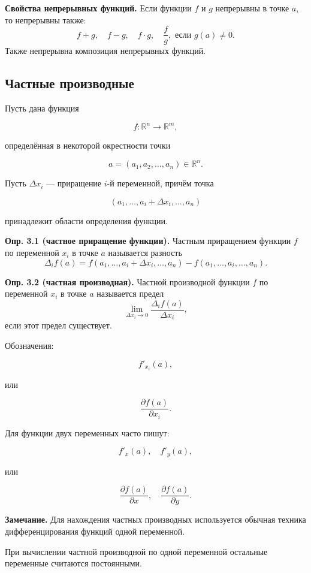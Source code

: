 \documentclass[a4paper,12pt]{article}
\begin{document}
\begin{theorembox}
\textbf{Свойства непрерывных функций.}
Если функции $f$ и $g$ непрерывны в точке $a$, то непрерывны также:
\[
f+g,\quad
f-g,\quad
f\cdot g,\quad
\frac{f}{g}, \text{ если } g(a)\ne 0.
\]
Также непрерывна композиция непрерывных функций.
\end{theorembox}

\subsection*{Частные производные}

Пусть дана функция

\[
f:\mathbb{R}^n\to\mathbb{R}^m,
\]

определённая в некоторой окрестности точки

\[
a=(a_1,a_2,\ldots,a_n)\in\mathbb{R}^n.
\]

Пусть $\Delta x_i$ — приращение $i$-й переменной, причём точка

\[
(a_1,\ldots,a_i+\Delta x_i,\ldots,a_n)
\]

принадлежит области определения функции.

\begin{definitionbox}
\textbf{Опр. 3.1 (частное приращение функции).}
Частным приращением функции $f$ по переменной $x_i$ в точке $a$ называется разность
\[
\Delta_i f(a)
=
f(a_1,\ldots,a_i+\Delta x_i,\ldots,a_n)
-
f(a_1,\ldots,a_i,\ldots,a_n).
\]
\end{definitionbox}

\begin{definitionbox}
\textbf{Опр. 3.2 (частная производная).}
Частной производной функции $f$ по переменной $x_i$ в точке $a$ называется предел
\[
\lim_{\Delta x_i\to 0}
\frac{\Delta_i f(a)}{\Delta x_i},
\]
если этот предел существует.
\end{definitionbox}

Обозначения:

\[
f'_{x_i}(a),
\]

или

\[
\frac{\partial f(a)}{\partial x_i}.
\]

Для функции двух переменных часто пишут:

\[
f'_x(a),\quad f'_y(a),
\]

или

\[
\frac{\partial f(a)}{\partial x},
\quad
\frac{\partial f(a)}{\partial y}.
\]

\begin{notebox}
\textbf{Замечание.}
Для нахождения частных производных используется обычная техника дифференцирования функций одной переменной.

При вычислении частной производной по одной переменной остальные переменные считаются постоянными.
\end{notebox}
\end{document}
